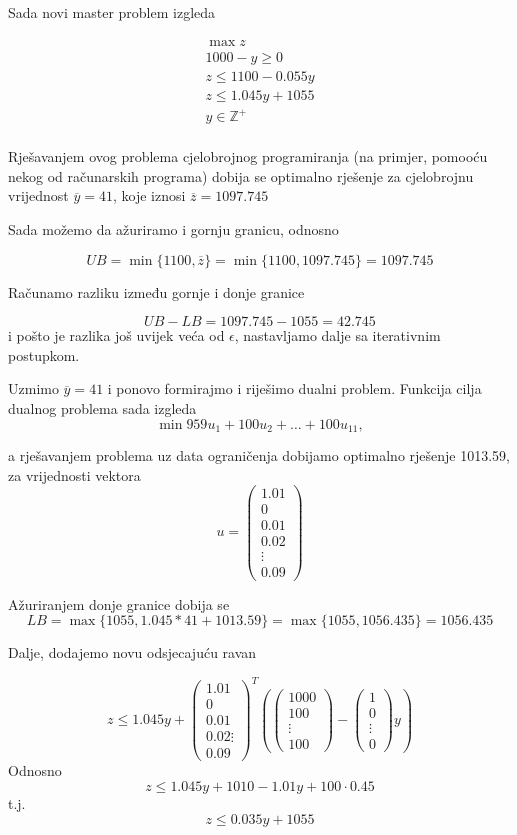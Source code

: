 \documentclass[a4paper, utf8, 11pt, colorlinks]{book}
\begin{document}
Sada novi master problem izgleda 


$$
\begin{aligned}
	\max z\\
	1000-y\geqslant 0\\
	z\leqslant 1100-0.055y\\ 
	z\leqslant 1.045y+1055\\
	y\in\mathbb{Z}^+\\	
\end{aligned}
$$


Rješavanjem ovog problema cjelobrojnog programiranja (na primjer, pomooću nekog od računarskih programa) dobija se optimalno rješenje za cjelobrojnu vrijednost $\overline{y}=41$, koje iznosi $\overline{z} = 1097.745$

Sada možemo da ažuriramo i gornju granicu, odnosno 

$$UB = \min\{1100,\overline{z}\} =  \min\{1100,1097.745\} =1097.745$$

Računamo razliku između gornje i donje granice

$$UB-LB=1097.745-1055 = 42.745$$
i pošto je razlika još uvijek veća od $\epsilon$, nastavljamo dalje sa iterativnim postupkom.

Uzmimo $\overline{y}=41$ i ponovo formirajmo i riješimo dualni problem. 
Funkcija cilja dualnog problema sada izgleda 
$$\min 959u_1+ 100u_2+\ldots+100u_{11},$$

a rješavanjem problema uz data ograničenja dobijamo optimalno rješenje 1013.59, za vrijednosti vektora 
$$u=\left(\begin{array}{c}
	1.01 \\
	0 \\
	0.01\\
	0.02\\
	\vdots \\
	0.09
\end{array}\right)$$

Ažuriranjem donje granice dobija se 
$$LB = \max\{1055,1.045*41+1013.59\} = \max\{1055,1056.435\} = 1056.435 $$

Dalje, dodajemo novu odsjecajuću ravan

$$z\leqslant 1.045y+\left(\begin{array}{c}
	1.01 \\
	0 \\
	0.01\\
	0.02
	\vdots \\
	0.09
\end{array}\right)^T
\left(\left(\begin{array}{c}
	1000 \\
	100 \\
	\vdots \\
	100
\end{array}\right)-\left(\begin{array}{c}
	1 \\
	0 \\
	\vdots \\
	0
\end{array}\right)y\right)$$
Odnosno 
$$z\leqslant 1.045y+1010-1.01y+100\cdot0.45$$
t.j.
$$z\leqslant 0.035y+1055$$
\end{document}
